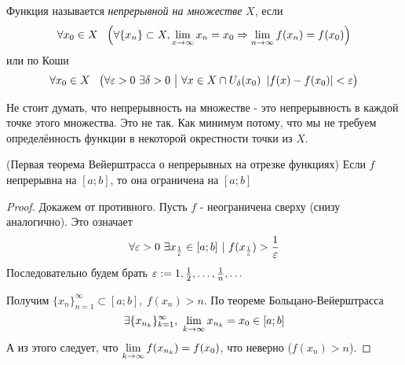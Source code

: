 \begin{definition}
	Функция называется \textit{непрерывной на множестве} $X$, если 
	\[
		\forall x_0 \in X\ \ \left(\forall \{x_n\} \subset X, \lim\limits_{x \to \infty} x_n = x_0 \Rightarrow \lim\limits_{n \to \infty} f(x_n) = f(x_0)\right)
	\]
	или по Коши
	\[
		\forall x_0 \in X\ \ \left(\forall \eps > 0\ \exists \delta > 0 \such \forall x \in X \cap U_\delta(x_0)\ \left|f(x) - f(x_0)\right| < \eps\right)
	\]
\end{definition}

\begin{note}
	Не стоит думать, что непрерывность на множестве - это непрерывность в каждой точке этого множества. Это не так. Как минимум потому, что мы не требуем определённость функции в некоторой окрестности точки из $X$.
\end{note}

\begin{theorem} (Первая теорема Вейерштрасса о непрерывных на отрезке функциях)
	Если $f$ непрерывна на $[a; b]$, то она ограничена на $[a; b]$
\end{theorem}

\begin{proof}
	Докажем от противного. Пусть $f$ - неограничена сверху (снизу аналогично). Это означает
	$$
		\forall \varepsilon > 0\ \exists x_{\frac{1}{\varepsilon}} \in [a; b]\ |\ f(x_{\frac{1}{\varepsilon}}) > \frac{1}{\varepsilon}
	$$
	Последовательно будем брать $\varepsilon := 1, \frac{1}{2}, \dots, \frac{1}{n}, \dots$
	
	Получим $\{x_n\}_{n = 1}^\infty \subset [a; b],\ f(x_n) > n$. По теореме Больцано-Вейерштрасса
	$$
		\exists \{x_{n_k}\}_{k = 1}^\infty,\ \lim\limits_{k \to \infty} x_{n_k} = x_0 \in [a; b]
	$$
	А из этого следует, что $\lim\limits_{k \to \infty} f(x_{n_k}) = f(x_0)$, что неверно ($f(x_n) > n$).
\end{proof}